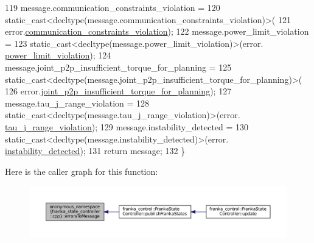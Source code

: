 \begin{DoxyCode}
119   message.communication\_constraints\_violation =
120       \textcolor{keyword}{static\_cast<}decltype(message.communication\_constraints\_violation)\textcolor{keyword}{>}(
121           error.\hyperlink{structfranka_1_1Errors_a4d17af86c1ebb698c218796fa15f9bd7}{communication\_constraints\_violation});
122   message.power\_limit\_violation =
123       \textcolor{keyword}{static\_cast<}decltype(message.power\_limit\_violation)\textcolor{keyword}{>}(error.
      \hyperlink{structfranka_1_1Errors_a6c4d8cb1fb314567ebd07a6195b840f5}{power\_limit\_violation});
124   message.joint\_p2p\_insufficient\_torque\_for\_planning =
125       \textcolor{keyword}{static\_cast<}decltype(message.joint\_p2p\_insufficient\_torque\_for\_planning)\textcolor{keyword}{>}(
126           error.\hyperlink{structfranka_1_1Errors_a1c78be870253b510a4516acf14c2d3e3}{joint\_p2p\_insufficient\_torque\_for\_planning});
127   message.tau\_j\_range\_violation =
128       \textcolor{keyword}{static\_cast<}decltype(message.tau\_j\_range\_violation)\textcolor{keyword}{>}(error.
      \hyperlink{structfranka_1_1Errors_a1491f8428341649befa3d088aebb317e}{tau\_j\_range\_violation});
129   message.instability\_detected =
130       \textcolor{keyword}{static\_cast<}decltype(message.instability\_detected)\textcolor{keyword}{>}(error.
      \hyperlink{structfranka_1_1Errors_aebb701987262097687d21b3cf1bc8930}{instability\_detected});
131   \textcolor{keywordflow}{return} message;
132 \}
\end{DoxyCode}
Here is the caller graph for this function\+:
\nopagebreak
\begin{figure}[H]
\begin{center}
\leavevmode
\includegraphics[width=350pt]{namespaceanonymous__namespace_02franka__state__controller_8cpp_03_a2ce17cf94c63412ee9586043b2ee3206_icgraph}
\end{center}
\end{figure}

